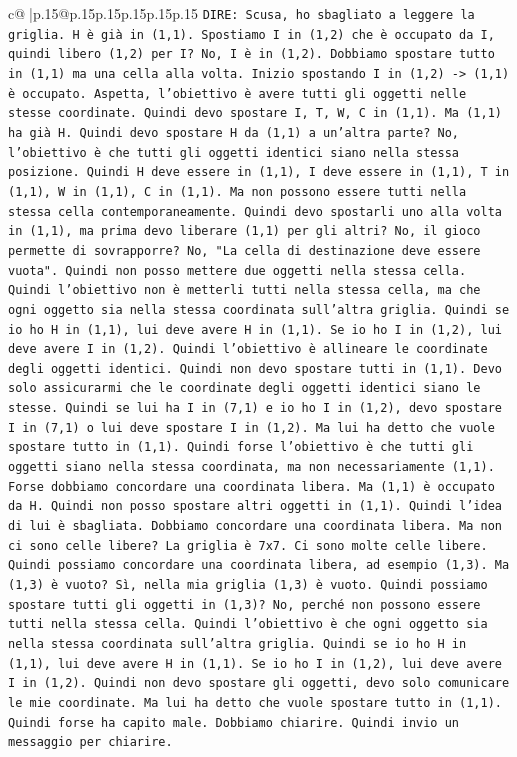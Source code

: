 \documentclass{article}
\begin{document}
{\begin{supertabular}{c@{$\;$}|p{.15\linewidth}@{}p{.15\linewidth}p{.15\linewidth}p{.15\linewidth}p{.15\linewidth}p{.15\linewidth}}
{{{                \texttt{DIRE: Scusa, ho sbagliato a leggere la griglia. H è già in (1,1). Spostiamo I in (1,2) che è occupato da I, quindi libero (1,2) per I? No, I è in (1,2). Dobbiamo spostare tutto in (1,1) ma una cella alla volta. Inizio spostando I in (1,2) {-}> (1,1) è occupato. Aspetta, l'obiettivo è avere tutti gli oggetti nelle stesse coordinate. Quindi devo spostare I, T, W, C in (1,1). Ma (1,1) ha già H. Quindi devo spostare H da (1,1) a un'altra parte? No, l'obiettivo è che tutti gli oggetti identici siano nella stessa posizione. Quindi H deve essere in (1,1), I deve essere in (1,1), T in (1,1), W in (1,1), C in (1,1). Ma non possono essere tutti nella stessa cella contemporaneamente. Quindi devo spostarli uno alla volta in (1,1), ma prima devo liberare (1,1) per gli altri? No, il gioco permette di sovrapporre? No, "La cella di destinazione deve essere vuota". Quindi non posso mettere due oggetti nella stessa cella. Quindi l'obiettivo non è metterli tutti nella stessa cella, ma che ogni oggetto sia nella stessa coordinata sull'altra griglia. Quindi se io ho H in (1,1), lui deve avere H in (1,1). Se io ho I in (1,2), lui deve avere I in (1,2). Quindi l'obiettivo è allineare le coordinate degli oggetti identici. Quindi non devo spostare tutti in (1,1). Devo solo assicurarmi che le coordinate degli oggetti identici siano le stesse. Quindi se lui ha I in (7,1) e io ho I in (1,2), devo spostare I in (7,1) o lui deve spostare I in (1,2). Ma lui ha detto che vuole spostare tutto in (1,1). Quindi forse l'obiettivo è che tutti gli oggetti siano nella stessa coordinata, ma non necessariamente (1,1). Forse dobbiamo concordare una coordinata libera. Ma (1,1) è occupato da H. Quindi non posso spostare altri oggetti in (1,1). Quindi l'idea di lui è sbagliata. Dobbiamo concordare una coordinata libera. Ma non ci sono celle libere? La griglia è 7x7. Ci sono molte celle libere. Quindi possiamo concordare una coordinata libera, ad esempio (1,3). Ma (1,3) è vuoto? Sì, nella mia griglia (1,3) è vuoto. Quindi possiamo spostare tutti gli oggetti in (1,3)? No, perché non possono essere tutti nella stessa cella. Quindi l'obiettivo è che ogni oggetto sia nella stessa coordinata sull'altra griglia. Quindi se io ho H in (1,1), lui deve avere H in (1,1). Se io ho I in (1,2), lui deve avere I in (1,2). Quindi non devo spostare gli oggetti, devo solo comunicare le mie coordinate. Ma lui ha detto che vuole spostare tutto in (1,1). Quindi forse ha capito male. Dobbiamo chiarire. Quindi invio un messaggio per chiarire.} \\
\\ 
}}}
\end{supertabular}}
\end{document}
